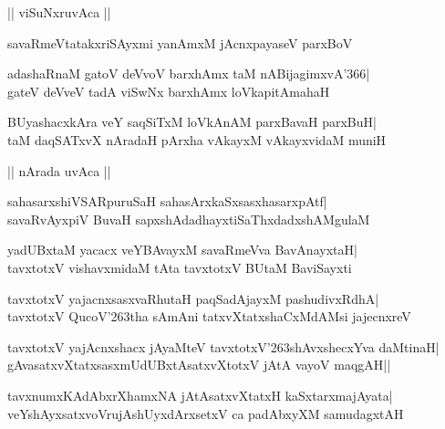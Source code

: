 \documentclass[twoside,12pt,openright]{book}
\def\S{\char'263}
\newcounter{shloka}[chapter]
\begin{document}
\begin{center}
|| viSuNxruvAca ||
\end{center}
\begin{shloka}%
savaRmeVtatakxriSAyxmi yanAmxM jAcnxpayaseV parxBoV
\end{shloka}

\begin{shloka}%
adashaRnaM gatoV deVvoV barxhAmx taM nABijagimxvA\char'366|\\
gateV deVveV tadA viSwNx barxhAmx loVkapitAmahaH
\end{shloka}

\begin{shloka}%
BUyashacxkAra veY saqSiTxM loVkAnAM parxBavaH parxBuH|\\
taM daqSATxvX nAradaH pArxha vAkayxM vAkayxvidaM muniH
\end{shloka}

\begin{center}
|| nArada uvAca ||
\end{center}
\begin{shloka}%
sahasarxshiVSARpuruSaH sahasArxkaSxsasxhasarxpAtf|\\
savaRvAyxpiV BuvaH sapxshAdadhayxtiSaThxdadxshAMgulaM
\end{shloka}

\begin{shloka}%
yadUBxtaM yacacx veYBAvayxM savaRmeVva BavAnayxtaH|\\
tavxtotxV vishavxmidaM tAta tavxtotxV BUtaM BaviSayxti
\end{shloka}

\begin{shloka}%
tavxtotxV yajacnxsasxvaRhutaH paqSadAjayxM pashudivxRdhA|\\
tavxtotxV QucoV\S tha sAmAni tatxvXtatxshaCxMdAMsi jajecnxreV
\end{shloka}

\begin{shloka}%
tavxtotxV yajAcnxshacx jAyaMteV tavxtotxV\S shAvxshecxYva daMtinaH|\\
gAvasatxvXtatxsasxmUdUBxtAsatxvXtotxV jAtA vayoV maqgAH||
\end{shloka}

\begin{shloka}%
tavxnumxKAdAbxrXhamxNA jAtAsatxvXtatxH kaSxtarxmajAyata|\\
veYshAyxsatxvoVrujAshUyxdArxsetxV ca padAbxyXM samudagxtAH
\end{shloka}
\end{document}

